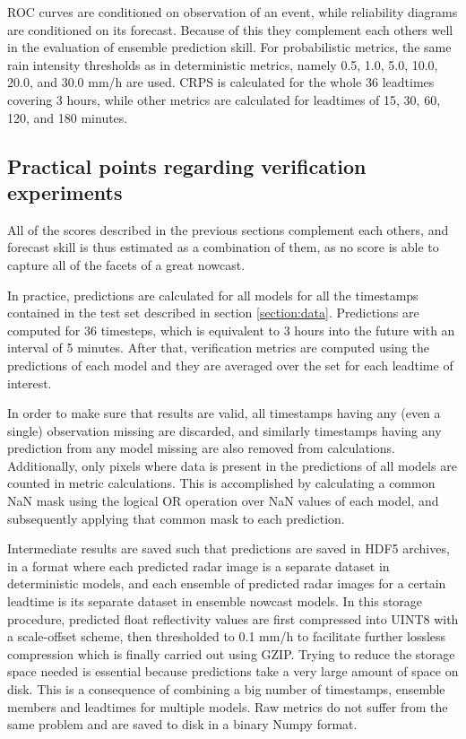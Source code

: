 ROC curves are conditioned on observation of an event, while reliability diagrams are conditioned on its forecast. Because of this they complement each others well in the evaluation of ensemble prediction skill. For probabilistic metrics, the same rain intensity thresholds as in deterministic metrics, namely 0.5, 1.0, 5.0, 10.0, 20.0, and 30.0 mm/h are used. CRPS is calculated for the whole 36 leadtimes covering 3 hours, while other metrics are calculated for leadtimes of 15, 30, 60, 120, and 180 minutes. 


\subsection{Practical points regarding verification experiments}

 All of the scores described in the previous sections complement each others, and forecast skill is thus estimated as a combination of them, as no score is able to capture all of the facets of a great nowcast. 
 
 In practice, predictions are calculated for all models for all the timestamps contained in the test set described in section \ref{section:data}. Predictions are computed for 36 timesteps, which is equivalent to 3 hours into the future with an interval of 5 minutes. After that, verification metrics are computed using the predictions of each model and they are averaged over the set for each leadtime of interest. 
 
 In order to make sure that results are valid, all timestamps having any (even a single) observation missing are discarded, and similarly timestamps having any prediction from any model missing are also removed from calculations. Additionally, only pixels where data is present in the predictions of all models are counted in metric calculations. This is accomplished by calculating a common NaN mask using the logical OR operation over NaN values of each model, and subsequently applying that common mask to each prediction.
 
 Intermediate results are saved such that predictions are saved in HDF5 archives, in a format where each predicted radar image is a separate dataset in deterministic models, and each ensemble of predicted radar images for a certain leadtime is its separate dataset in ensemble nowcast models. In this storage procedure, predicted float reflectivity values are first compressed into UINT8 with a scale-offset scheme, then thresholded to 0.1 mm/h to facilitate further lossless compression which is finally carried out using GZIP. Trying to reduce the storage space needed is essential because predictions take a very large amount of space on disk. This is a consequence of combining a big number of timestamps, ensemble members and leadtimes for multiple models. Raw metrics do not suffer from the same problem and are saved to disk in a binary Numpy format.  
 
